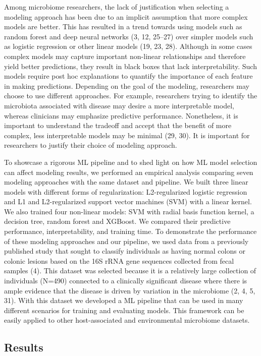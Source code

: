 \documentclass[11pt,]{article}
\begin{document}
Among microbiome researchers, the lack of justification when selecting a
modeling approach has been due to an implicit assumption that more
complex models are better. This has resulted in a trend towards using
models such as random forest and deep neural networks (3, 12, 25--27)
over simpler models such as logistic regression or other linear models
(19, 23, 28). Although in some cases complex models may capture
important non-linear relationships and therefore yield better
predictions, they result in black boxes that lack interpretability. Such
models require post hoc explanations to quantify the importance of each
feature in making predictions. Depending on the goal of the modeling,
researchers may choose to use different approaches. For example,
researchers trying to identify the microbiota associated with disease
may desire a more interpretable model, whereas clinicians may emphasize
predictive performance. Nonetheless, it is important to understand the
tradeoff and accept that the benefit of more complex, less interpretable
models may be minimal (29, 30). It is important for researchers to
justify their choice of modeling approach.

To showcase a rigorous ML pipeline and to shed light on how ML model
selection can affect modeling results, we performed an empirical
analysis comparing seven modeling approaches with the same dataset and
pipeline. We built three linear models with different forms of
regularization: L2-regularized logistic regression and L1 and
L2-regularized support vector machines (SVM) with a linear kernel. We
also trained four non-linear models: SVM with radial basis function
kernel, a decision tree, random forest and XGBoost. We compared their
predictive performance, interpretability, and training time. To
demonstrate the performance of these modeling approaches and our
pipeline, we used data from a previously published study that sought to
classify individuals as having normal colons or colonic lesions based on
the 16S rRNA gene sequences collected from fecal samples (4). This
dataset was selected because it is a relatively large collection of
individuals (N=490) connected to a clinically significant disease where
there is ample evidence that the disease is driven by variation in the
microbiome (2, 4, 5, 31). With this dataset we developed a ML pipeline
that can be used in many different scenarios for training and evaluating
models. This framework can be easily applied to other host-associated
and environmental microbiome datasets.

\subsection{Results}\label{results}
\end{document}
